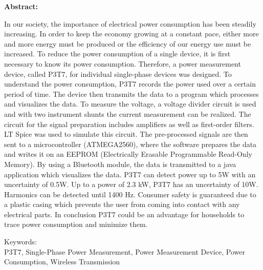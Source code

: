 \pagebreak
\textbf{Abstract:}

In our society, the importance of electrical power consumption has been steadily increasing. In order to keep the economy growing at a constant pace, either more and more energy must be produced or the efficiency of our energy use must be increased. To reduce the power consumption of a single device, it is first necessary to know its power consumption. Therefore, a power measurement device, called P3T7, for individual single-phase devices was designed. To understand the power consumption, P3T7 records the power used over a certain period of time. The device then transmits the data to a program which processes and visualizes the data. To measure the voltage, a voltage divider circuit is used and with two instrument shunts the current measurement can be realized. The circuit for the signal preparation includes amplifiers as well as first-order filters. LT Spice was used to simulate this circuit. The pre-processed signals are then sent to a microcontroller (ATMEGA2560), where the software prepares the data and writes it on an EEPROM (Electrically Erasable Programmable Read-Only Memory). By using a Bluetooth module, the data is transmitted to a java application which visualizes the data. P3T7 can detect power up to 5W with an uncertainty of 0.5W. Up to a power of 2.3 kW, P3T7 has an uncertainty of 10W. Harmonics can be detected until 1400 Hz. Consumer safety is guaranteed due to a plastic casing which prevents the user from coming into contact with any electrical parts. In conclusion P3T7 could be an advantage for households to trace power consumption and minimize them.

\vspace{5cm}
Keywords:\\
P3T7, Single-Phase Power Measurement, Power Measurement Device, Power Consumption, Wireless Transmission






\pagebreak